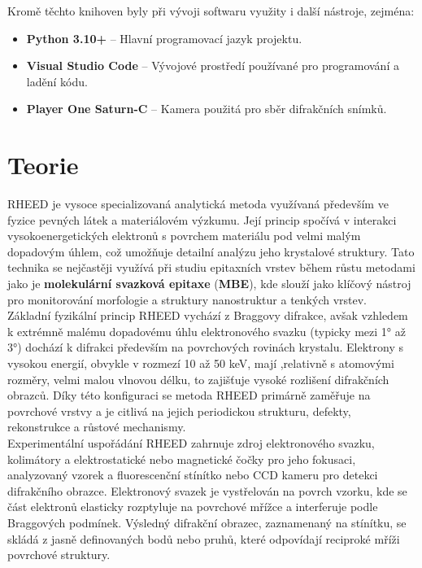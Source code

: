 \documentclass[a4paper,11pt]{article}
\begin{document}
Kromě těchto knihoven byly při vývoji softwaru využity i další nástroje, zejména:

\begin{itemize}
    \item \textbf{Python 3.10+} – Hlavní programovací jazyk projektu.
    \item \textbf{Visual Studio Code} – Vývojové prostředí používané pro programování a ladění kódu.
    \item \textbf{Player One Saturn-C} – Kamera použitá pro sběr difrakčních snímků.
\end{itemize}

\newpage

\section{Teorie}
RHEED je vysoce specializovaná analytická metoda využívaná především ve fyzice pevných látek a materiálovém výzkumu. Její princip spočívá v interakci vysokoenergetických elektronů s povrchem materiálu pod velmi malým dopadovým úhlem, což umožňuje detailní analýzu jeho krystalové struktury. Tato technika se nejčastěji využívá při studiu epitaxních vrstev během růstu metodami jako je \textbf{molekulární svazková epitaxe} (\textbf{MBE}), kde slouží jako klíčový nástroj pro monitorování morfologie a struktury nanostruktur a tenkých vrstev.\\

Základní fyzikální princip RHEED vychází z Braggovy difrakce, avšak vzhledem k extrémně malému dopadovému úhlu elektronového svazku (typicky mezi 1° až 3°) dochází k difrakci především na povrchových rovinách krystalu. Elektrony s vysokou energií, obvykle v rozmezí 10 až 50 keV, mají ,relativně s atomovými rozměry, velmi malou vlnovou délku, to zajišťuje vysoké rozlišení difrakčních obrazců. Díky této konfiguraci se metoda RHEED primárně zaměřuje na povrchové vrstvy a je citlivá na jejich periodickou strukturu, defekty, rekonstrukce a růstové mechanismy.\\

Experimentální uspořádání RHEED zahrnuje zdroj elektronového svazku, kolimátory a elektrostatické nebo magnetické čočky pro jeho fokusaci, analyzovaný vzorek a fluorescenční stínítko nebo CCD kameru pro detekci difrakčního obrazce. Elektronový svazek je vystřelován na povrch vzorku, kde se část elektronů elasticky rozptyluje na povrchové mřížce a interferuje podle Braggových podmínek. Výsledný difrakční obrazec, zaznamenaný na stínítku, se skládá z jasně definovaných bodů nebo pruhů, které odpovídají reciproké mříži povrchové struktury.\\
\end{document}
